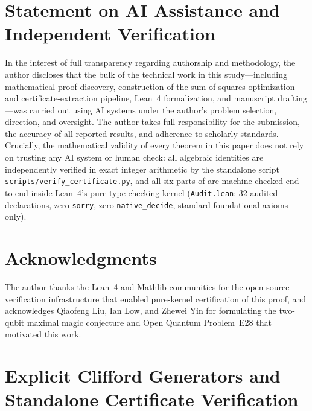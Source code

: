 \documentclass[11pt,a4paper]{article}
\theoremstyle{plain}
\theoremstyle{definition}
\theoremstyle{remark}
\newcommand{\code}[1]{\texttt{\small #1}}
\begin{document}
\section*{Statement on AI Assistance and Independent Verification}
In the interest of full transparency regarding authorship and methodology, the author discloses that the bulk of the technical work in this study---including mathematical proof discovery, construction of the sum-of-squares optimization and certificate-extraction pipeline, Lean~4 formalization, and manuscript drafting---was carried out using AI systems under the author's problem selection, direction, and oversight. The author takes full responsibility for the submission, the accuracy of all reported results, and adherence to scholarly standards. Crucially, the mathematical validity of every theorem in this paper does not rely on trusting any AI system or human check: all algebraic identities are independently verified in exact integer arithmetic by the standalone script \code{scripts/verify\_certificate.py}, and all six parts of  are machine-checked end-to-end inside Lean~4's pure type-checking kernel (\code{Audit.lean}: $32$ audited declarations, zero \code{sorry}, zero \code{native\_decide}, standard foundational axioms only).

\section*{Acknowledgments}
The author thanks the Lean~4 and Mathlib communities for the open-source verification infrastructure that enabled pure-kernel certification of this proof, and acknowledges Qiaofeng Liu, Ian Low, and Zhewei Yin for formulating the two-qubit maximal magic conjecture and Open Quantum Problem~E28 that motivated this work.

\appendix
\section{Explicit Clifford Generators and Standalone Certificate Verification}
\label{app:explicit}
\end{document}
